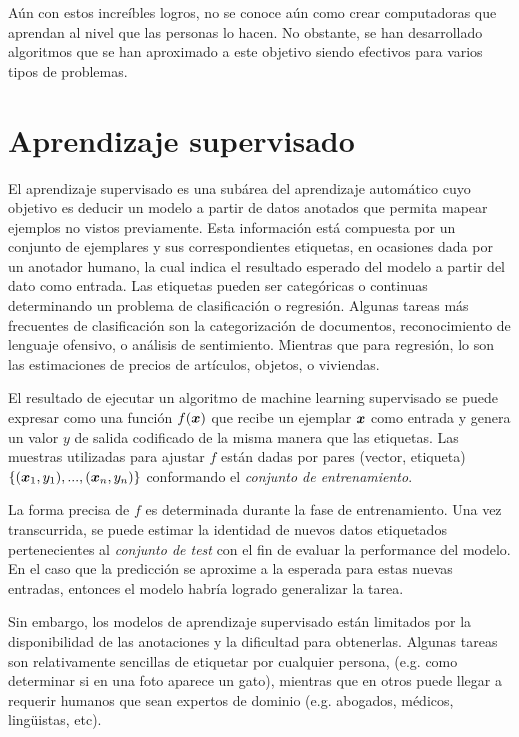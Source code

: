 Aún con estos increíbles logros, no se conoce aún como crear computadoras que
aprendan al nivel que las personas lo hacen. No obstante, se han desarrollado
algoritmos que se han aproximado a este objetivo siendo efectivos para varios
tipos de problemas.

\section{Aprendizaje supervisado}

El aprendizaje supervisado es una subárea del aprendizaje automático cuyo
objetivo es deducir un modelo a partir de datos anotados que permita mapear
ejemplos no vistos previamente. Esta información está compuesta por un conjunto
de ejemplares y sus correspondientes etiquetas, en ocasiones dada por un
anotador humano, la cual indica el resultado esperado del modelo a partir del dato como
entrada. Las etiquetas pueden ser categóricas o continuas determinando un
problema de clasificación o regresión. Algunas tareas más frecuentes de
clasificación son la categorización de documentos, reconocimiento de lenguaje
ofensivo, o análisis de sentimiento. Mientras que para regresión, lo son las
estimaciones de precios de artículos, objetos, o viviendas.

El resultado de ejecutar un algoritmo de machine learning supervisado se puede
expresar como una función $f(\boldsymbol{x})$ que recibe un ejemplar $\boldsymbol{x}$ como
entrada y genera un valor $y$ de salida codificado de la misma manera
que las etiquetas. Las muestras utilizadas para ajustar $f$ están dadas por
pares (vector, etiqueta) $\{(\boldsymbol{x}_1, y_1), ..., (\boldsymbol{x}_n, y_n)\}$
conformando el \emph{conjunto de entrenamiento}.

La forma precisa de $f$ es determinada durante la fase de entrenamiento. Una vez
transcurrida, se puede estimar la identidad de nuevos datos etiquetados
pertenecientes al \emph{conjunto de test} con el fin de evaluar la performance
del modelo. En el caso que la predicción se aproxime a la esperada para estas
nuevas entradas, entonces el modelo habría logrado generalizar la tarea.

Sin embargo, los modelos de aprendizaje supervisado están limitados por la
disponibilidad de las anotaciones y la dificultad para obtenerlas.
Algunas tareas son relativamente sencillas de etiquetar por cualquier
persona, (e.g. como determinar si en una foto aparece un gato), mientras que en
otros puede llegar a requerir humanos que sean expertos de dominio (e.g.
abogados, médicos, lingüistas, etc).

